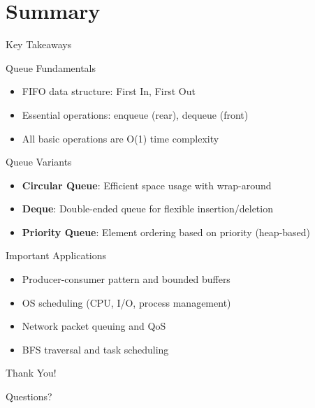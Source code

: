 \documentclass[aspectratio=169,xcolor=dvipsnames]{beamer}
\begin{document}
\section{Summary}

\begin{frame}{Key Takeaways}
  \begin{block}{Queue Fundamentals}
    \begin{itemize}
      \item FIFO data structure: First In, First Out
      \item Essential operations: enqueue (rear), dequeue (front)
      \item All basic operations are O(1) time complexity
    \end{itemize}
  \end{block}

  \begin{block}{Queue Variants}
    \begin{itemize}
      \item \textbf{Circular Queue}: Efficient space usage with wrap-around
      \item \textbf{Deque}: Double-ended queue for flexible insertion/deletion
      \item \textbf{Priority Queue}: Element ordering based on priority (heap-based)
    \end{itemize}
  \end{block}

  \begin{block}{Important Applications}
    \begin{itemize}
      \item Producer-consumer pattern and bounded buffers
      \item OS scheduling (CPU, I/O, process management)
      \item Network packet queuing and QoS
      \item BFS traversal and task scheduling
    \end{itemize}
  \end{block}
\end{frame}

\begin{frame}[plain]
  \begin{center}
    {\Huge Thank You!}

    \vspace{1cm}

    {\large Questions?}
  \end{center}
\end{frame}
\end{document}
